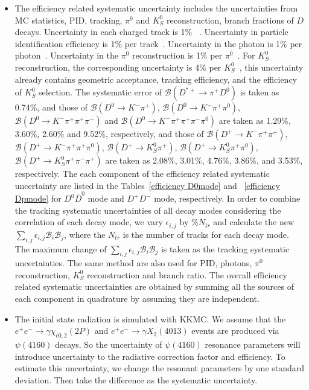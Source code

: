 \documentclass[aps,preprint,tightenlines,superscriptaddress,showpacs,byrevtex,amsmath,amssymb,nofloatfix]{revtex4}
\begin{document}
\begin{itemize}
\item The efficiency related systematic uncertainty includes the uncertainties from MC statistics, PID, tracking, $\pi^{0}$ and $K_{S}^{0}$ reconstruction, branch fractions of $D$ decays. Uncertainty in each charged track is 1\%~\cite{Tracking} . Uncertainty in particle identification efficiency is 1\% per track~\cite{Tracking}. Uncertainty in the photon is 1\% per photon~\cite{Photon}. Uncertainty in the $\pi^{0}$ reconstruction is 1\% per $\pi^{0}$~\cite{Photon}. For $K^{0}_{S}$ reconstruction, the corresponding uncertainty is 4\% per $K^{0}_{S}$~\cite{K_S0}, this uncertainty already contains geometric acceptance, tracking efficiency, and the efficiency of $K^{0}_{S}$ selection. The systematic error of $\mathcal{B}(D^{*+}\rightarrow\pi^{+}D^{0})$ is taken as 0.74\%, and those of $\mathcal{B}(D^{0} \rightarrow K^{-}\pi^{+})$, $\mathcal{B}(D^{0} \rightarrow K^{-}\pi^{+}\pi^{0})$, $\mathcal{B}(D^{0} \rightarrow K^{-}\pi^{+}\pi^{+}\pi^{-})$ and $\mathcal{B}(D^{0} \rightarrow K^{-}\pi^{+}\pi^{+}\pi^{-}\pi^{0})$ are taken as 1.29\%, 3.60\%, 2.60\% and 9.52\%, respectively, and those of $\mathcal{B}(D^{+} \rightarrow K^{-}\pi^{+}\pi^{+})$, $\mathcal{B}(D^{+} \rightarrow K^{-}\pi^{+}\pi^{+}\pi^{0})$, $\mathcal{B}(D^{+} \rightarrow K^{0}_{S}\pi^{+})$, $\mathcal{B}(D^{+} \rightarrow K^{0}_{S}\pi^{+}\pi^{0})$, $\mathcal{B}(D^{+} \rightarrow K^{0}_{S}\pi^{+}\pi^{-}\pi^{+})$ are taken as 2.08\%, 3.01\%, 4.76\%, 3.86\%, and 3.53\%, respectively. The each component of the efficiency related systematic uncertainty are listed in the Tables~\ref{efficiency D0mode} and ~\ref{efficiency Dpmode} for $D^{0}\bar{D}^{0}$ mode and $D^{+}D^{-}$ mode, respectively.  In order to combine the tracking systematic uncertainties of all decay modes considering the correlation of each decay mode, we vary $\epsilon_{i,j}$ by \%$N_{tr}$ and calculate the new $\sum_{i,j}\epsilon_{i,j} \mathcal{B}_{i}\mathcal{B}_{j}$, where the $N_{tr}$ is the number of tracks for each decay mode. The maximum change of  $\sum_{i,j}\epsilon_{i,j} \mathcal{B}_{i}\mathcal{B}_{j}$ is taken as the  tracking systematic uncertainties. The same method are also used for PID, photons, $\pi^{0}$ reconstruction, $K^{0}_{S}$ reconstruction and branch ratio. The overall efficiency related systematic uncertainties are obtained by summing all the sources of each component in quadrature by assuming they are independent.

\item The initial state radiation is simulated with KKMC. We assume that the $e^{+}e^{-} \rightarrow \gamma \chi_{c0,2}(2P)$ and $e^{+}e^{-} \rightarrow \gamma X_{2}(4013)$ events are produced via $\psi(4160)$ decays. So the uncertainty of $\psi(4160)$ resonance parameters will introduce uncertainty to the radiative correction factor and efficiency. To estimate
    this uncertainty, we change the resonant parameters by one standard deviation.  Then take the difference as the systematic uncertainty.
\end{itemize}
\end{document}
